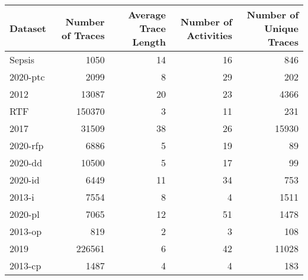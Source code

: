 \begin{tabular}{lrrrr}
\toprule
Dataset & Number of Traces & Average Trace Length & Number of Activities & Number of Unique Traces \\
\midrule
Sepsis & 1050 & 14 & 16 & 846 \\
2020-ptc & 2099 & 8 & 29 & 202 \\
2012 & 13087 & 20 & 23 & 4366 \\
RTF & 150370 & 3 & 11 & 231 \\
2017 & 31509 & 38 & 26 & 15930 \\
2020-rfp & 6886 & 5 & 19 & 89 \\
2020-dd & 10500 & 5 & 17 & 99 \\
2020-id & 6449 & 11 & 34 & 753 \\
2013-i & 7554 & 8 & 4 & 1511 \\
2020-pl & 7065 & 12 & 51 & 1478 \\
2013-op & 819 & 2 & 3 & 108 \\
2019 & 226561 & 6 & 42 & 11028 \\
2013-cp & 1487 & 4 & 4 & 183 \\
\bottomrule
\end{tabular}
